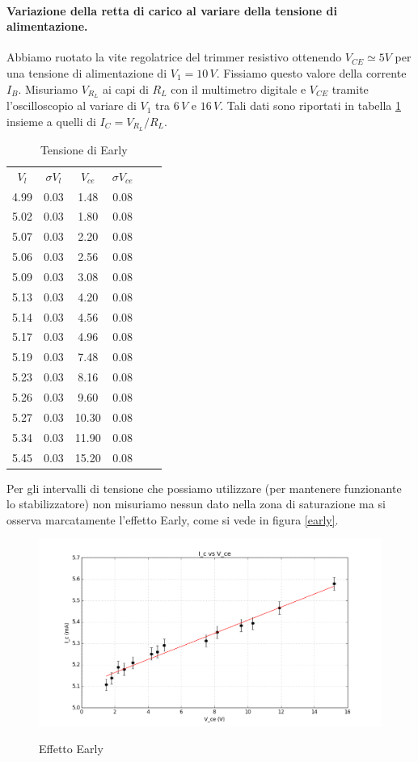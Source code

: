 \documentclass[10pt,a4paper]{article}
\begin{document}
\paragraph{Variazione della retta di carico al variare della tensione di alimentazione.}
 
Abbiamo ruotato la vite regolatrice del trimmer resistivo ottenendo $V_{CE}\simeq 5V$ per una tensione di alimentazione di $V_1 = 10 \, V$. Fissiamo questo valore della corrente $I_B$. Misuriamo  $V_{R_L}$ ai capi di $R_L$ con il multimetro digitale  e $V_{CE}$ tramite l'oscilloscopio al variare di $V_1$ tra $6\,V$ e $16\,V$. Tali dati sono riportati in tabella \ref{dati2} insieme a quelli di $I_C=V_{R_L}/R_L$.

\begin{table}[!htb]\centering
\begin{tabular}{|c|c|c|c|c|c|}
\hline
$V_l$ & $\sigma V_l$ & $V_{ce}$ & $\sigma V_{ce}$\\
4.99 & 0.03 & 1.48 & 0.08\\
5.02 & 0.03 & 1.80 & 0.08\\
5.07 & 0.03 & 2.20 & 0.08\\
5.06 & 0.03 & 2.56 & 0.08\\
5.09 & 0.03 & 3.08 & 0.08\\
5.13 & 0.03 & 4.20 & 0.08\\
5.14 & 0.03 & 4.56 & 0.08\\
5.17 & 0.03 & 4.96 & 0.08\\
5.19 & 0.03 & 7.48 & 0.08\\
5.23 & 0.03 & 8.16 & 0.08\\
5.26 & 0.03 & 9.60 & 0.08\\
5.27 & 0.03 & 10.30 & 0.08\\
5.34 & 0.03 & 11.90 & 0.08\\
5.45 & 0.03 & 15.20 & 0.08\\
\hline
\end{tabular}
\caption{Tensione di Early}
\label{dati2}
\end{table}

Per gli intervalli di tensione che possiamo utilizzare (per mantenere funzionante lo stabilizzatore) non misuriamo nessun dato nella zona di saturazione ma si osserva marcatamente l'effetto Early, come si vede in figura \ref{early}.

\begin{figure}[!htb]
  \centering
  \includegraphics[scale=0.4]{Early.png} \label{early}
\caption{Effetto Early}
\label{circuito}
\end{figure}
\end{document}
